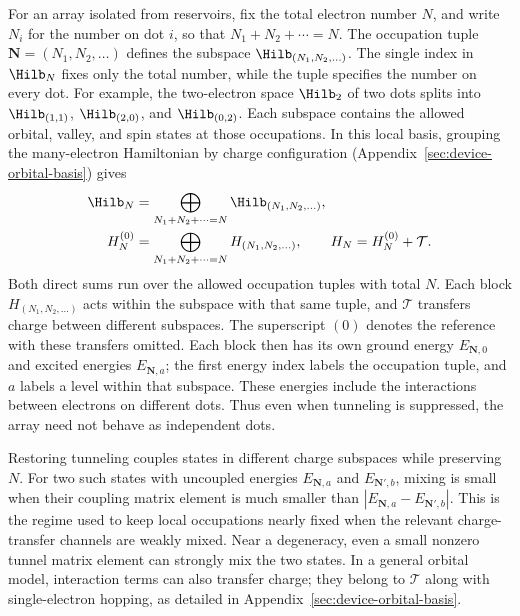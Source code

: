 For an array isolated from reservoirs, fix the total electron number
$N$, and write $N_i$ for the number on dot $i$, so that
$N_1+N_2+\cdots=N$. The occupation tuple
$\mathbf N=(N_1,N_2,\ldots)$ defines the subspace
$\Hilb_{(N_1,N_2,\ldots)}$. The single index in $\Hilb_N$
fixes only the total number, while the tuple specifies the number
on every dot. For example, the two-electron space $\Hilb_2$ of
two dots splits into $\Hilb_{(1,1)}$, $\Hilb_{(2,0)}$, and
$\Hilb_{(0,2)}$. Each subspace contains the allowed orbital,
valley, and spin states at those occupations. In this local basis,
grouping the many-electron Hamiltonian by charge configuration
(Appendix~\ref{sec:device-orbital-basis}) gives
\begin{equation}
 \begin{aligned}
  \Hilb_N&=\bigoplus_{N_1+N_2+\cdots=N}
                 \Hilb_{(N_1,N_2,\ldots)},\\
  H_N^{(0)}&=\bigoplus_{N_1+N_2+\cdots=N}
                 H_{(N_1,N_2,\ldots)},
  \qquad H_N=H_N^{(0)}+\mathcal T.
 \end{aligned}
 \label{eq:dot-charge-blocks}
\end{equation}
Both direct sums run over the allowed occupation tuples with total
$N$. Each block $H_{(N_1,N_2,\ldots)}$ acts within the subspace with
that same tuple, and $\mathcal T$ transfers charge between different
subspaces. The superscript $(0)$ denotes the reference with these
transfers omitted. Each block then has its own ground energy
$E_{\mathbf N,0}$ and excited energies $E_{\mathbf N,a}$; the first
energy index labels the occupation tuple, and $a$ labels a level
within that subspace. These energies include the interactions
between electrons on different dots. Thus even when tunneling is
suppressed, the array need not behave as independent dots.

Restoring tunneling couples states in different charge subspaces
while preserving $N$. For two such states with uncoupled energies
$E_{\mathbf N,a}$ and $E_{\mathbf N',b}$, mixing is small when their
coupling matrix element is much smaller than
$|E_{\mathbf N,a}-E_{\mathbf N',b}|$. This is the regime used to keep
local occupations nearly fixed when the relevant charge-transfer
channels are weakly mixed. Near a degeneracy, even a small
nonzero tunnel matrix element can strongly mix the two states.
In a general orbital model, interaction terms can also transfer
charge; they belong to $\mathcal T$ along with single-electron
hopping, as detailed in Appendix~\ref{sec:device-orbital-basis}.

